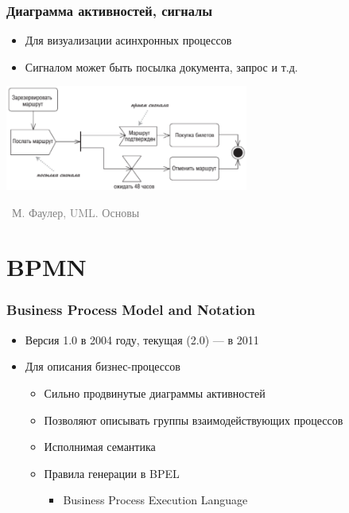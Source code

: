 \documentclass[xetex,mathserif,serif]{beamer}
\newcommand{\attribution}[1] {
    \vspace{-5mm}\begin{flushright}\begin{scriptsize}\textcolor{gray}{\textcopyright\, #1}\end{scriptsize}\end{flushright}
}
\begin{document}
    \begin{frame}
        \frametitle{Диаграмма активностей, сигналы}
        \begin{itemize}
            \item Для визуализации асинхронных процессов
            \item Сигналом может быть посылка документа, запрос и т.д.
        \end{itemize}
        \begin{center}
            \includegraphics[width=0.6\textwidth]{activitySignals.png}
            \attribution{М. Фаулер, UML. Основы}
        \end{center}
    \end{frame}

    \section{BPMN}

    \begin{frame}
        \frametitle{Business Process Model and Notation}
        \begin{itemize}
            \item Версия 1.0 в 2004 году, текущая (2.0) --- в 2011
            \item Для описания бизнес-процессов
            \begin{itemize}
                \item Сильно продвинутые диаграммы активностей
                \item Позволяют описывать группы взаимодействующих процессов
                \item Исполнимая семантика
                \item Правила генерации в BPEL
                \begin{itemize}
                    \item Business Process Execution Language
                \end{itemize}
            \end{itemize}
        \end{itemize}
    \end{frame}
\end{document}
